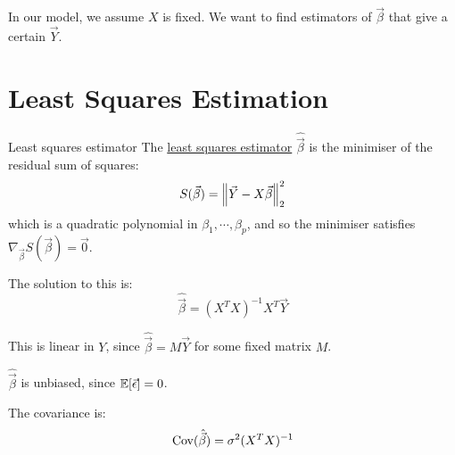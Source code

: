 \documentclass[../Main.tex]{subfiles}
\begin{document}
In our model, we assume $X$ is fixed. We want to find estimators of $\vec{\beta}$ that give a certain $\vec{Y}$.
\section{Least Squares Estimation}
\begin{definition}{Least squares estimator}
    The \underline{least squares estimator} $\hat{\vec{\beta}}$ is the minimiser of the residual sum of squares:
    \begin{equation*}
        S(\vec{\beta}) = \left\|\vec{Y} - X\vec{\beta}\right\|_2^2
    \end{equation*}
    which is a quadratic polynomial in $\beta_1, \cdots, \beta_p$, and so the minimiser satisfies $\nabla_{\vec{\beta}} S(\vec{\beta}) = \vec0$.
\end{definition}
\begin{remarks}
    \item The solution to this is:
        \begin{equation*}
            \hat{\vec{\beta}} = (X^T X)^{-1} X^T \vec{Y}
        \end{equation*}
    \item This is linear in $Y$, since $\hat{\vec{\beta}} = M\vec{Y}$ for some fixed matrix $M$.
    \item $\hat{\vec{\beta}}$ is unbiased, since $\mathbb{E}[\vec{\epsilon}] = 0$.
    \item The covariance is:
        \begin{equation*}
            \operatorname{Cov}(\hat{\vec{\beta}}) = \sigma^2 (X^T X)^{-1}
        \end{equation*}
\end{remarks}
\end{document}
